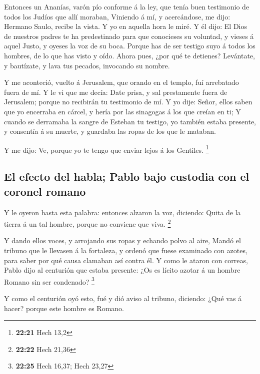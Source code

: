  Entonces un Ananías, varón pío conforme á la ley, que
tenía buen testimonio de todos los Judíos que allí moraban,
 Viniendo á mí, y acercándose, me dijo: Hermano Saulo,
recibe la vista. Y yo en aquella hora le miré.  Y él
dijo: El Dios de nuestros padres te ha predestinado para que conocieses
su voluntad, y vieses á aquel Justo, y oyeses la voz de su boca.
 Porque has de ser testigo suyo á todos los hombres, de
lo que has visto y oído.  Ahora pues, ¿por qué te
detienes? Levántate, y bautízate, y lava tus pecados, invocando su
nombre.

 Y me aconteció, vuelto á Jerusalem, que orando en el
templo, fuí arrebatado fuera de mí.  Y le vi que me
decía: Date prisa, y sal prestamente fuera de Jerusalem; porque no
recibirán tu testimonio de mí.  Y yo dije: Señor, ellos
saben que yo encerraba en cárcel, y hería por las sinagogas á los que
creían en ti;  Y cuando se derramaba la sangre de Esteban
tu testigo, yo también estaba presente, y consentía á su muerte, y
guardaba las ropas de los que le mataban.

 Y me dijo: Ve, porque yo te tengo que enviar lejos á los
Gentiles. \footnote{\textbf{22:21} Hech 13,2}

\hypertarget{el-efecto-del-habla-pablo-bajo-custodia-con-el-coronel-romano}{%
\subsection{El efecto del habla; Pablo bajo custodia con el coronel
romano}\label{el-efecto-del-habla-pablo-bajo-custodia-con-el-coronel-romano}}

 Y le oyeron hasta esta palabra: entonces alzaron la voz,
diciendo: Quita de la tierra á un tal hombre, porque no conviene que
viva. \footnote{\textbf{22:22} Hech 21,36}

 Y dando ellos voces, y arrojando sus ropas y echando
polvo al aire,  Mandó el tribuno que le llevasen á la
fortaleza, y ordenó que fuese examinado con azotes, para saber por qué
causa clamaban así contra él.  Y como le ataron con
correas, Pablo dijo al centurión que estaba presente: ¿Os es lícito
azotar á un hombre Romano sin ser condenado? \footnote{\textbf{22:25}
  Hech 16,37; Hech 23,27}

 Y como el centurión oyó esto, fué y dió aviso al
tribuno, diciendo: ¿Qué vas á hacer? porque este hombre es Romano.

